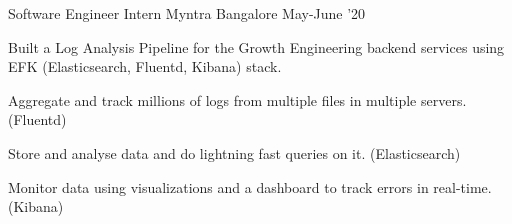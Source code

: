 

\begin{cventries}
  \cventry
    {Software Engineer Intern} %
    {Myntra} %
    {Bangalore} %
    {May-June '20} %
    {
      \begin{cvitems}
        \item {Built a Log Analysis Pipeline for the Growth Engineering backend services using EFK (Elasticsearch, Fluentd, Kibana) stack.}
        \item {Aggregate and track millions of logs from multiple files in multiple servers. (Fluentd)}
        \item {Store and analyse data and do lightning fast queries on it. (Elasticsearch)}
        \item {Monitor data using visualizations and a dashboard to track errors in real-time. (Kibana)}
      \end{cvitems}
    }
    {}

\end{cventries}
